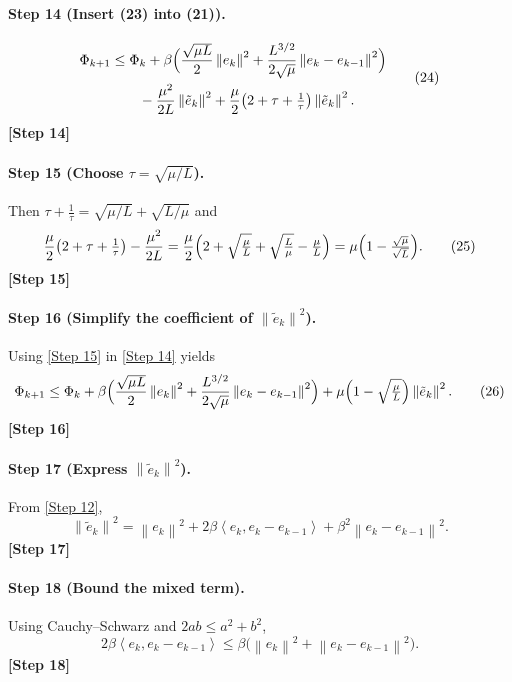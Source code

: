 \documentclass{article}
\newcommand{\norm}[1]{\left\lVert#1\right\rVert}
\newcommand{\inner}[2]{\left\langle #1,#2\right\rangle}
\begin{document}
\paragraph{Step 14 (Insert (23) into (21)).}
\[
\begin{aligned}
\Phi_{k+1}
&\le \Phi_{k}
+\beta\Bigl(\frac{\sqrt{\mu L}}{2}\norm{e_{k}}^{2}
+\frac{L^{3/2}}{2\sqrt{\mu}}\norm{e_{k}-e_{k-1}}^{2}\Bigr)\\
&\qquad-\frac{\mu^{2}}{2L}\norm{\tilde e_{k}}^{2}
+\frac{\mu}{2}\bigl(2+\tau+\tfrac{1}{\tau}\bigr)\norm{\tilde e_{k}}^{2}.
\end{aligned}
\tag{24}
\]
\textbf{[Step 14]}

\paragraph{Step 15 (Choose $\tau=\sqrt{\mu/L}$).}
Then $\tau+\frac{1}{\tau}= \sqrt{\mu/L}+ \sqrt{L/\mu}$ and
\[
\frac{\mu}{2}\bigl(2+\tau+\tfrac{1}{\tau}\bigr)
-\frac{\mu^{2}}{2L}
= \frac{\mu}{2}\Bigl(2+\sqrt{\tfrac{\mu}{L}}+\sqrt{\tfrac{L}{\mu}}-\tfrac{\mu}{L}\Bigr)
= \mu\Bigl(1-\tfrac{\sqrt{\mu}}{\sqrt{L}}\Bigr).
\tag{25}
\]
\textbf{[Step 15]}

\paragraph{Step 16 (Simplify the coefficient of $\norm{\tilde e_{k}}^{2}$).}
Using \eqref{Step 15} in \eqref{Step 14} yields
\[
\Phi_{k+1}\le \Phi_{k}
+\beta\Bigl(\frac{\sqrt{\mu L}}{2}\norm{e_{k}}^{2}
+\frac{L^{3/2}}{2\sqrt{\mu}}\norm{e_{k}-e_{k-1}}^{2}\Bigr)
+\mu\Bigl(1-\sqrt{\tfrac{\mu}{L}}\Bigr)\norm{\tilde e_{k}}^{2}.
\tag{26}
\]
\textbf{[Step 16]}

\paragraph{Step 17 (Express $\norm{\tilde e_{k}}^{2}$).}
From \eqref{Step 12},
\[
\norm{\tilde e_{k}}^{2}
= \norm{e_{k}}^{2}+2\beta\inner{e_{k}}{e_{k}-e_{k-1}}
+\beta^{2}\norm{e_{k}-e_{k-1}}^{2}.
\tag{27}
\]
\textbf{[Step 17]}

\paragraph{Step 18 (Bound the mixed term).}
Using Cauchy–Schwarz and $2ab\le a^{2}+b^{2}$,
\[
2\beta\inner{e_{k}}{e_{k}-e_{k-1}}
\le \beta\bigl(\norm{e_{k}}^{2}+\norm{e_{k}-e_{k-1}}^{2}\bigr).
\tag{28}
\]
\textbf{[Step 18]}
\end{document}
